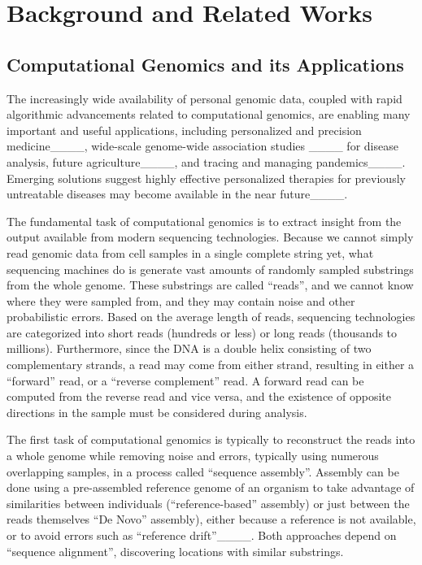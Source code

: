 \section{Background and Related Works}
\label{sec:background}

\subsection{Computational Genomics and its Applications}

The increasingly wide availability of personal genomic data, coupled with rapid algorithmic advancements related to computational genomics, are enabling many important and useful applications, including personalized and precision medicine____, wide-scale genome-wide association studies
____ for disease analysis, future agriculture____, and tracing and managing pandemics____.
Emerging solutions suggest highly effective personalized therapies for previously untreatable diseases may become available in the near future____.

The fundamental task of computational genomics is to extract insight from the output available from modern sequencing technologies.
Because we cannot simply read genomic data from cell samples in a single complete string yet, what sequencing machines do is generate vast amounts of randomly sampled substrings from the whole genome.
These substrings are called ``reads'', and we cannot know where they were sampled from, and they may contain noise and other probabilistic errors.
Based on the average length of reads, sequencing technologies are categorized into short reads (hundreds or less) or long reads (thousands to millions).
Furthermore, since the DNA is a double helix consisting of two complementary strands, a read may come from either strand, resulting in either a ``forward'' read, or a ``reverse complement'' read.
A forward read can be computed from the reverse read and vice versa, and the existence of opposite directions in the sample must be considered during analysis.

The first task of computational genomics is typically to reconstruct the reads into a whole genome while removing noise and errors, typically using numerous overlapping samples, in a process called ``sequence assembly''.
Assembly can be done using a pre-assembled reference genome of an organism to take advantage of similarities between individuals (``reference-based'' assembly) or just between the reads themselves ``De Novo'' assembly), either because a reference is not available, or to avoid errors such as ``reference drift''____.
Both approaches depend on ``sequence alignment'', discovering locations with similar substrings.


